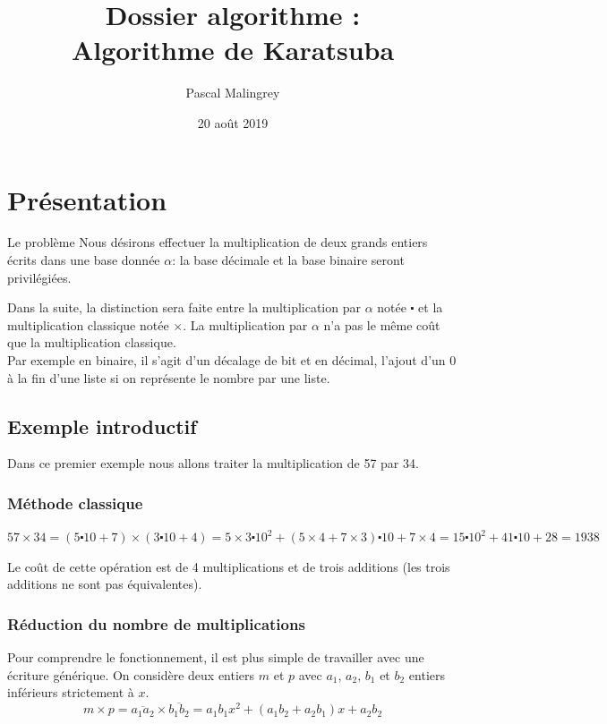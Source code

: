 \documentclass[11pt,french]{article}
\title{Dossier algorithme :
\\
Algorithme de Karatsuba}
\author{Pascal Malingrey}
\date{20 août 2019}
\theoremstyle{plain}
\newcommand{\x}{\times}
\newcommand{\cd}{\centerdot}
\begin{document}
\maketitle

\tableofcontents
\newpage

\section{Présentation}

\begin{bclogo}{Le problème}
Nous désirons effectuer la multiplication de deux grands entiers écrits dans une base donnée $\alpha$: la base décimale et la base binaire seront privilégiées.
\end{bclogo}
Dans la suite, la distinction sera faite entre la multiplication par $\alpha$ notée $\centerdot$ et la multiplication classique notée $\times$. La multiplication par $\alpha$ n'a pas le même coût que la multiplication classique. \\ Par exemple en binaire, il s'agit d'un décalage de bit et en décimal, l'ajout d'un 0 à la fin d'une liste si on représente le nombre par une liste.

\subsection{Exemple introductif}

Dans ce premier exemple nous allons traiter la multiplication de 57 par 34.
\subsubsection{Méthode classique}
$57 \times 34=(5\centerdot 10 + 7)\times (3 \centerdot10 +4 )=5\x 3 \centerdot 10^2 + (5\x4+7\x3)\cd 10+7\x4=15\cd 10^2 + 41\cd 10 + 28=1938$

Le coût de cette opération est de 4 multiplications et de trois  additions (les trois additions ne sont pas équivalentes).

\subsubsection{Réduction du nombre de multiplications}

Pour comprendre le fonctionnement, il est plus simple de travailler avec une écriture générique.
On considère deux entiers $m$ et $p$ avec $a_1,\, a_2, \, b_1$ et $b_2$ entiers inférieurs strictement à $x$.
\begin{equation}
m\x p = \overline{a_1 a_2}\x \overline{b_1 b_2} =  a_1 b_1 x^2 + \left( a_1 b_2 +a_2 b_1\right)x+a_2 b_2  \label{eqc}
\end{equation}
\end{document}

